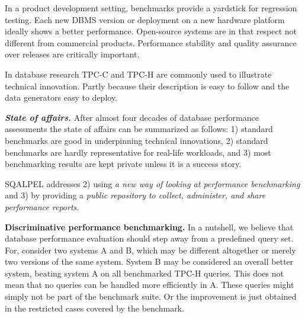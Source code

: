 \documentclass{cidr-2019}
\begin{document}
In a product development setting, benchmarks provide a yardstick for
regression testing. Each new DBMS version or deployment on a new
hardware platform ideally shows a better performance.
Open-source systems are in that respect not different from commercial
products. Performance stability and quality assurance over releases
are critically important.

In database research TPC-C and TPC-H are commonly used to illustrate
technical innovation. Partly because their description is easy to
follow and the data generators easy to deploy.

\emph{\bf State of affairs.} After almost four decades of database
performance assessments the state of affairs can be summarized as
follows: 1) standard benchmarks are good in underpinning technical
innovations, 2) standard benchmarks are hardly representative for
real-life workloads\cite{DBLP:conf/sigmod/VogelsgesangHFK18}, and 3)
most benchmarking results are kept private unless it is a success
story.

{\sc SQALPEL} addresses 2) using \emph{a new way of looking at
  performance benchmarking} and 3) by providing a \emph{public
  repository to collect, administer, and share performance reports}.


{\bf Discriminative performance benchmarking.}  In a nutshell, we
believe that database performance evaluation should step away from a
predefined query set. For, consider two systems A and B, which may be
different altogether or merely two versions of the same system. System
B may be considered an overall better system, beating system A on all
benchmarked TPC-H queries. This does not mean that no queries can be
handled more efficiently in A. These queries might simply not be part
of the benchmark suite. Or the improvement is just obtained in the
restricted cases covered by the benchmark.
\end{document}
